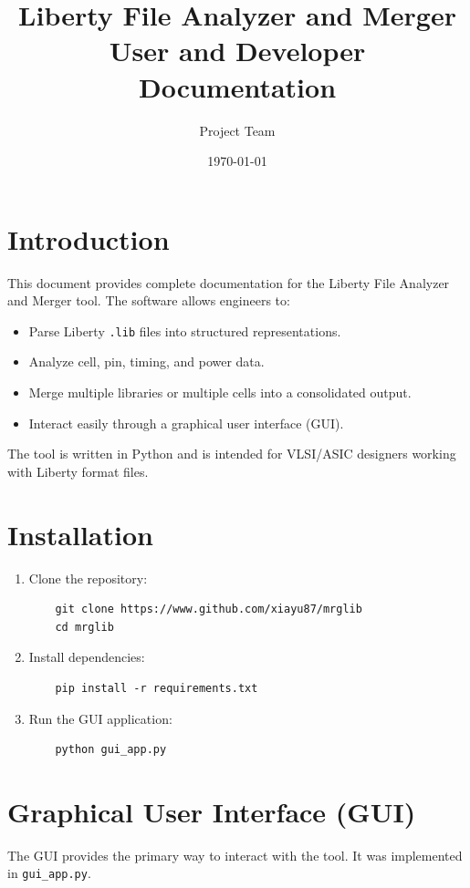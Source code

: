 \documentclass[12pt,a4paper]{article}
\title{Liberty File Analyzer and Merger \\ \large User and Developer Documentation}
\author{Project Team}
\date{\today}
\begin{document}
\maketitle
\tableofcontents
\newpage

\section{Introduction}
This document provides complete documentation for the Liberty File Analyzer and Merger tool. The software allows engineers to:
\begin{itemize}
    \item Parse Liberty \texttt{.lib} files into structured representations.
    \item Analyze cell, pin, timing, and power data.
    \item Merge multiple libraries or multiple cells into a consolidated output.
    \item Interact easily through a graphical user interface (GUI).
\end{itemize}

The tool is written in Python and is intended for VLSI/ASIC designers working with Liberty format files.

\section{Installation}
\begin{enumerate}
    \item Clone the repository:
    \begin{verbatim}
    git clone https://www.github.com/xiayu87/mrglib
    cd mrglib
    \end{verbatim}
    \item Install dependencies:
    \begin{verbatim}
    pip install -r requirements.txt
    \end{verbatim}
    \item Run the GUI application:
    \begin{verbatim}
    python gui_app.py
    \end{verbatim}
\end{enumerate}

\section{Graphical User Interface (GUI)}

The GUI provides the primary way to interact with the tool. It was implemented in \texttt{gui\_app.py}.
\end{document}
